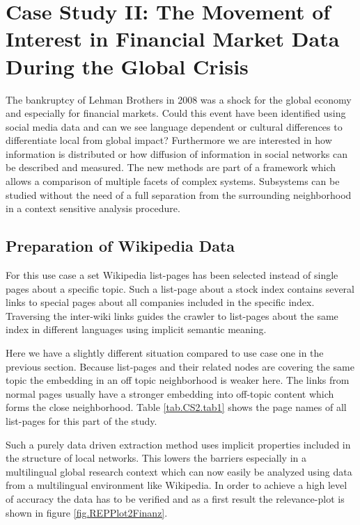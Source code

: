 \documentclass[a4paper,10pt]{scrbook}
\begin{document}
\clearpage

\section{Case Study II: The Movement of Interest in Financial Market Data During the Global Crisis}
The bankruptcy of Lehman Brothers in 2008 was a shock for the global economy and especially for financial markets. Could this event have been identified using social media data and can we see language dependent or cultural differences to differentiate local from global impact? Furthermore we are interested in how information is distributed or how diffusion of information in social networks can be described and measured. The new methods are part of a framework which allows a comparison of multiple facets of complex systems. Subsystems can be studied without the need of a full separation from the surrounding neighborhood in a context sensitive analysis procedure. 

\subsection{Preparation of Wikipedia Data}
For this use case a set Wikipedia list-pages has been selected instead of single pages about a specific topic. Such a  list-page about a stock index contains several links to special pages about all companies included in the specific index. Traversing the inter-wiki links guides the crawler to list-pages about the same index in different languages using implicit semantic meaning. 

\label{ext.tab.CS2.tab1} 


\label{ext.fig.REPPlot2Finanz} 

\clearpage

Here we have a slightly different situation compared to use case one in the previous section. Because list-pages and their related nodes are covering the same topic the embedding in an off topic neighborhood is weaker here. The links from normal pages usually have a stronger embedding into off-topic content which forms the close neighborhood. Table \ref{tab.CS2.tab1} shows the page names of all list-pages for this part of the study. 

Such a purely data driven extraction method uses implicit properties included in the structure of local networks. This lowers the barriers especially in a multilingual global research context which can now easily be analyzed using data from a multilingual environment like Wikipedia. In order to achieve a high level of accuracy the data has to be verified and as a first result the relevance-plot is shown in figure \ref{fig.REPPlot2Finanz}. 
 
\end{document}
